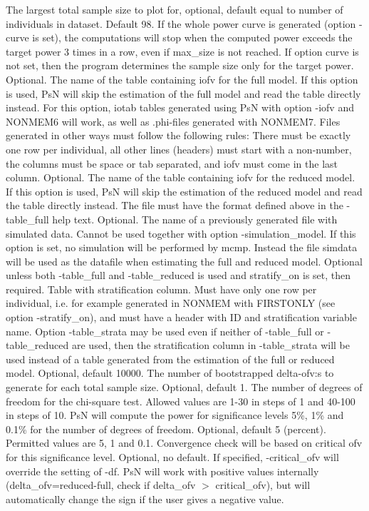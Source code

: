 \begin{optionlist}
\nextopt
{}
The largest total sample size to plot for, optional, default equal to number of individuals in dataset. 
\nextopt
{}
Default 98. If the whole power curve is generated (option -curve is set), the computations will stop when the computed power exceeds the target power 3 times in a row, even if max\_size is not reached. If option curve is not set, then the program determines the sample size only for the target power. 
\nextopt
{}
Optional. The name of the table containing iofv for the full model. If this option is used, PsN will skip the estimation of the full model and read the table directly instead. For this option, iotab tables generated using PsN with option -iofv and NONMEM6 will work, as well as .phi-files generated with NONMEM7. Files generated in other ways must follow the following rules: There must be exactly one row per individual, all other lines (headers) must start with a non-number, the columns must be space or tab separated, and iofv must come in the last column. 
\nextopt
{}
Optional. The name of the table containing iofv for the reduced model. If this option is used, PsN will skip the estimation of the reduced model and read the table directly instead. The file must have the format defined above in the -table\_full help text. 
\nextopt
{}
Optional. The name of a previously generated file with simulated data. Cannot be used together with option -simulation\_model. If this option is set, no simulation will be performed by mcmp. Instead the file simdata will be used as the datafile when estimating the full and reduced model. 
\nextopt
{}
Optional unless both -table\_full and -table\_reduced is used and stratify\_on is set, then required. Table with stratification column. Must have only one row per individual, i.e. for example generated in NONMEM with FIRSTONLY (see option -stratify\_on), and must have a header with ID and stratification variable name. Option -table\_strata may be used even if neither of -table\_full or -table\_reduced are used, then the stratification column in -table\_strata will be used instead of a table generated from the estimation of the full or reduced model. 
\nextopt
{}
Optional, default 10000. The number of bootstrapped delta-ofv:s to generate for each total sample size. 
\nextopt
{}
Optional, default 1. The number of degrees of freedom for the chi-square test. Allowed values are 1-30 in steps of 1 and 40-100 in steps of 10. PsN will compute the power for significance levels 5\%, 1\% and 0.1\% for the number of degrees of freedom. 
\nextopt
{}
Optional, default 5 (percent). Permitted values are 5, 1 and 0.1. Convergence check will be based on critical ofv for this significance level. 
\nextopt
{}
Optional, no default. If specified, -critical\_ofv will override the setting of -df. PsN will work with positive values internally (delta\_ofv=reduced-full, check if delta\_ofv $>$ critical\_ofv), but will automatically change the sign if the user gives a negative value. 
\nextopt
\end{optionlist}

